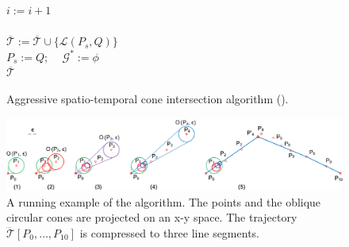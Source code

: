 {\begin{figure}[tb!]
\begin{center}
{\begin{minipage}{3.36in}
{	\icc \> \hspace{6ex} $i := i+1$ \\
	\icc \>\hspace{3ex} \Else\\
	\icc \> \hspace{6ex} $\overline{\mathcal{T}} := \overline{\mathcal{T}}\cup \{\mathcal{L}(P_s,Q)\}$ \\
	\icc \> \hspace{6ex} $P_s := Q$;  ~~$\mathcal{G}^* := \phi$ \\
	\icc \hspace{1ex}\Return $\overline{\mathcal{T}}$
%
%
}
\vspace{-2ex}
\myhrule
\end{minipage}
}
\end{center}
\vspace{-2ex}
\caption{\small Aggressive spatio-temporal cone intersection algorithm (\cista).}
\label{alg:ciseda}
\vspace{-2ex}
\end{figure}
}%




\begin{figure}[tb!]
\centering
\includegraphics[scale=0.8]{figures/Fig-conesta.png}
\vspace{-1ex}
\caption{\small A running example of the \cista algorithm. The points and the oblique circular cones are projected on an x-y space. The trajectory $\dddot{\mathcal{T}}[P_0, \ldots, P_{10}]$ is compressed to three line segments.}
\vspace{-2ex}
\label{fig:exm-consta}
\end{figure}



